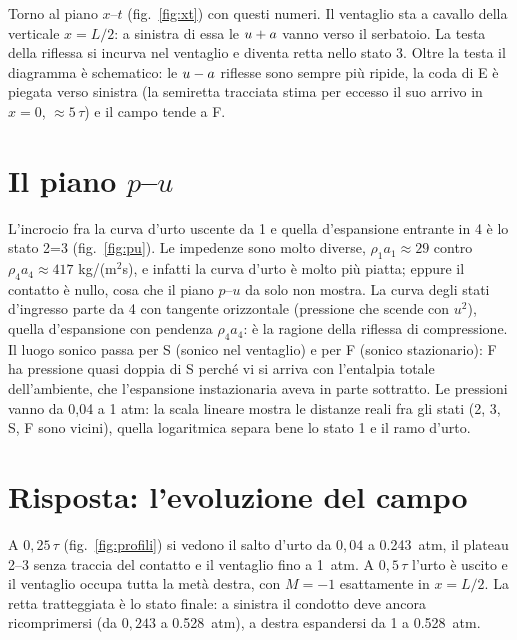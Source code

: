 Torno al piano $x$--$t$ (fig.~\ref{fig:xt}) con questi numeri. Il ventaglio sta a cavallo della verticale $x=L/2$: a
sinistra di essa le $u+a$ vanno verso il serbatoio. La testa della riflessa si incurva nel ventaglio e diventa retta
nello stato 3. Oltre la testa il diagramma è schematico: le $u-a$ riflesse sono sempre più ripide, la coda di E è
piegata verso sinistra (la semiretta tracciata stima per eccesso il suo arrivo in $x=0$, $\approx5\,\tau$) e il campo
tende a F.

\section*{Il piano $p$--$u$}
L'incrocio fra la curva d'urto uscente da 1 e quella d'espansione entrante in 4 è lo stato 2=3 (fig.~\ref{fig:pu}). Le
impedenze sono molto diverse, $\rho_1a_1\approx29$ contro $\rho_4a_4\approx417$ kg/(m$^2$s), e infatti la curva d'urto è
molto più piatta; eppure il contatto è nullo, cosa che il piano $p$--$u$ da solo non mostra. La curva degli stati
d'ingresso parte da 4 con tangente orizzontale (pressione che scende con $u^2$), quella d'espansione con pendenza
$\rho_4a_4$: è la ragione della riflessa di compressione. Il luogo sonico passa per S (sonico nel ventaglio) e per F
(sonico stazionario): F ha pressione quasi doppia di S perché vi si arriva con l'entalpia totale dell'ambiente, che
l'espansione instazionaria aveva in parte sottratto. Le pressioni vanno da 0,04 a 1 atm: la scala lineare mostra le
distanze reali fra gli stati (2, 3, S, F sono vicini), quella logaritmica separa bene lo stato 1 e il ramo d'urto.

\section*{Risposta: l'evoluzione del campo}
A $0{,}25\,\tau$ (fig.~\ref{fig:profili}) si vedono il salto d'urto da $0{,}04$ a \SI{0.243}{atm}, il plateau 2--3 senza
traccia del contatto e il ventaglio fino a \SI{1}{atm}. A $0{,}5\,\tau$ l'urto è uscito e il ventaglio occupa tutta la
metà destra, con $M=-1$ esattamente in $x=L/2$. La retta tratteggiata è lo stato finale: a sinistra il condotto deve
ancora ricomprimersi (da $0{,}243$ a \SI{0.528}{atm}), a destra espandersi da 1 a \SI{0.528}{atm}.


